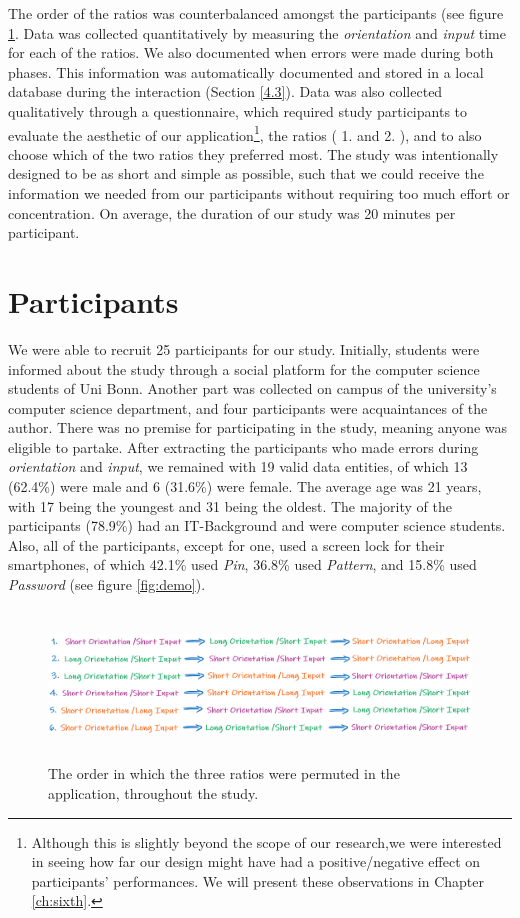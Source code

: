 The order of the ratios was counterbalanced amongst the participants (see figure \ref{fig:permutation}. Data was collected quantitatively by measuring the \textit{orientation} and \textit{input} time for each of the ratios. We also documented when errors were made during both phases. This information was automatically documented and stored in a local database during the interaction (Section \ref{4.3}). Data was also collected qualitatively through a questionnaire, which required study participants to evaluate the aesthetic of our application\footnote{Although this is slightly beyond the scope of our research,we were interested in seeing how far our design might have had a positive/negative effect on participants' performances. We will present these observations in Chapter \ref{ch:sixth}.}, the ratios ( 1. and 2. ), and to also choose which of the two ratios they preferred most. The study was intentionally designed to be as short and simple as possible, such that we could receive the information we needed from our participants without requiring too much effort or concentration. On average, the duration of our study was 20 minutes per participant. 

\section{Participants} \label{5.2}

We were able to recruit 25 participants for our study. Initially, students were informed about the study through a social platform for the computer science students of Uni Bonn. Another part was collected on campus of the university's computer science department, and four participants were acquaintances of the author. There was no premise for participating in the study, meaning anyone was eligible to partake. After extracting the participants who made errors during \textit{orientation} and \textit{input}, we remained with 19 valid data entities, of which 13 (62.4\%) were male and 6 (31.6\%) were female. The average age was 21 years, with 17 being the youngest and 31 being the oldest. The majority of the participants (78.9\%) had an IT-Background and were computer science students. Also, all of the participants, except for one, used a screen lock for their smartphones, of which 42.1\% used \textit{Pin}, 36.8\% used \textit{Pattern}, and 15.8\% used \textit{Password} (see figure \ref{fig:demo}). 

\begin{figure}[t!]
\centering
\includegraphics[width=14cm, height=4cm]{Chapters/graphics/permutation.PNG}
\caption{The order in which the three ratios were permuted in the application, throughout the study.}
\label{fig:permutation}
\end{figure}


